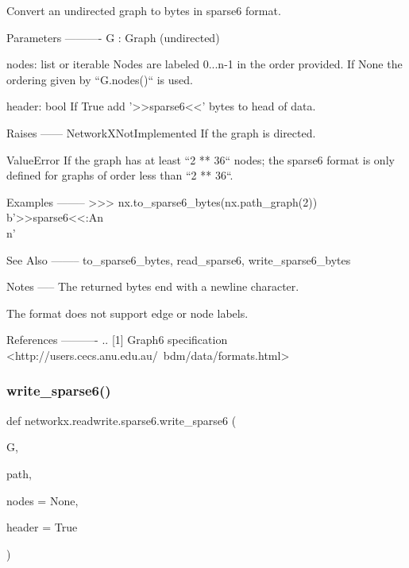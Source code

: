 \begin{DoxyVerb}Convert an undirected graph to bytes in sparse6 format.

Parameters
----------
G : Graph (undirected)

nodes: list or iterable
   Nodes are labeled 0...n-1 in the order provided.  If None the ordering
   given by ``G.nodes()`` is used.

header: bool
   If True add '>>sparse6<<' bytes to head of data.

Raises
------
NetworkXNotImplemented
    If the graph is directed.

ValueError
    If the graph has at least ``2 ** 36`` nodes; the sparse6 format
    is only defined for graphs of order less than ``2 ** 36``.

Examples
--------
>>> nx.to_sparse6_bytes(nx.path_graph(2))
b'>>sparse6<<:An\\n'

See Also
--------
to_sparse6_bytes, read_sparse6, write_sparse6_bytes

Notes
-----
The returned bytes end with a newline character.

The format does not support edge or node labels.

References
----------
.. [1] Graph6 specification
       <http://users.cecs.anu.edu.au/~bdm/data/formats.html>\end{DoxyVerb}
 \mbox{\label{namespacenetworkx_1_1readwrite_1_1sparse6_af3ccac7f6884a29ce94fc9ff1af89845}} 
\subsubsection{\texorpdfstring{write\+\_\+sparse6()}{write\_sparse6()}}
{\footnotesize\ttfamily def networkx.\+readwrite.\+sparse6.\+write\+\_\+sparse6 (\begin{DoxyParamCaption}\item[{}]{G,  }\item[{}]{path,  }\item[{}]{nodes = {\ttfamily None},  }\item[{}]{header = {\ttfamily True} }\end{DoxyParamCaption})}

